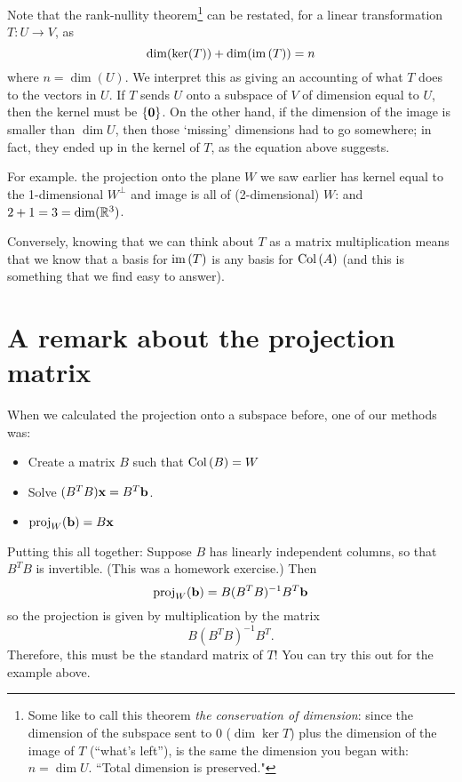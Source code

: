 Note that the rank-nullity theorem\footnote{Some like to call this theorem {\it the conservation of dimension}: since the dimension of the subspace sent to $0$ ($\dim \ker T$) plus the dimension of the image of $T$ (``what's left''),  is the same the dimension you began with: $n=\dim U$. ``Total dimension is preserved."} can be restated, for
a linear transformation $T \colon U \to V$, as 
$$
\dim(\ker(T)) + \dim(\operatorname{im}\,(T)) = n
$$
where $n = \dim(U)$.  We interpret this as giving an
accounting of what $T$ does to the vectors in $U$.
If $T$ sends $U$ onto a subspace of $V$ of dimension
equal to $U$, then the kernel must be $\{\mathbf{0}\}$.  On the
other hand, if the dimension of the image is smaller than $\dim U$, then
those `missing' dimensions had to go somewhere;
in fact, they ended up in the kernel of $T$, as the equation above suggests. 

For example. the projection onto the plane $W$ we saw
earlier has kernel equal to the 1-dimensional $W^\perp$
and image is all of (2-dimensional) $W$:  and $2+1=3 = \dim(\mathbb{R}^3)$.


Conversely, knowing that we can think about $T$ as a matrix
multiplication means that we know that a basis for $\operatorname{im}\,(T)$
is any basis for $\operatorname{Col\,}(A)$ (and this is something that we
find easy to answer).

\section{A remark about the projection matrix}
When we calculated the projection onto a subspace before, one of our methods was:
\begin{itemize}
\item Create a matrix $B$ such that $\operatorname{Col\,}(B) = W$
\item Solve $(B^TB)\mathbf{x} = B^T\mathbf{b}$.
\item $\operatorname{proj}_W(\mathbf{b}) = B\mathbf{x}$
\end{itemize}
Putting this all together:  Suppose $B$ has linearly independent
columns, so that $B^TB$ is invertible.  (This was a homework
exercise.)
Then
$$
\operatorname{proj}_W(\mathbf{b}) = B(B^TB)^{-1}B^T\mathbf{b}
$$
so the projection is given by multiplication by the matrix
$$
 B(B^TB)^{-1}B^T.
$$
Therefore, this must be the standard matrix of $T$!  You can
try this out for the example above.


